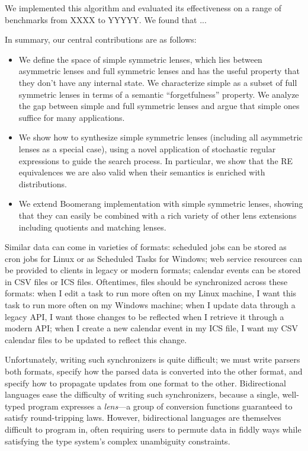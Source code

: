 \documentclass[acmsmall,screen,anonymous]{acmart}
\begin{document}
We implemented this algorithm and evaluated its effectiveness on a range of benchmarks
from XXXX to YYYYY. We found that ... 

In summary, our central contributions are as follows:
\begin{itemize}
\item We define the space of simple symmetric lenses, which lies between asymmetric lenses and full symmetric lenses and has the useful property that they don't have any internal state.  We characterize simple as a subset of full symmetric lenses in terms of a semantic ``forgetfulness'' property. We analyze the gap between simple and full symmetric lenses and argue that simple ones suffice for many applications.
\item We show how to synthesize simple symmetric lenses (including all asymmetric lenses as a special case), using a novel application of stochastic regular expressions to guide the search process.  In particular, we show that the RE equivalences we are also valid when their semantics is enriched with distributions.
\item We extend Boomerang implementation with simple symmetric lenses, showing that they can easily be combined with a rich variety of other lens extensions including quotients and matching lenses.
\end{itemize}


\noindent
{}

Similar data can come in varieties of formats: scheduled jobs can be stored as
cron jobs for Linux or as Scheduled Tasks for Windows; web service
resources can be provided to clients in legacy or modern formats;
calendar events can be stored in CSV files or ICS files. Oftentimes,
files should be synchronized across these formats: when I edit a task
to run more often on my Linux machine, I want this task to run more
often on my Windows machine; when I update data through a legacy API,
I want those changes to be reflected when I retrieve it through a
modern API; when I create a new calendar event in my ICS file, I want
my CSV calendar files to be updated to reflect this change.

Unfortunately, writing such synchronizers is quite difficult; we must write
parsers both formats, specify how the parsed data is converted into the other
format, and specify how to propagate updates from one format to the other.
Bidirectional languages ease the difficulty of writing such synchronizers,
because a single, well-typed program expresses a \emph{lens}---a group of
conversion functions guaranteed to satisfy round-tripping laws. However,
bidirectional languages are themselves difficult to program in, often requiring
users to permute data in fiddly ways while satisfying the type system's complex
unambiguity constraints.
\end{document}
